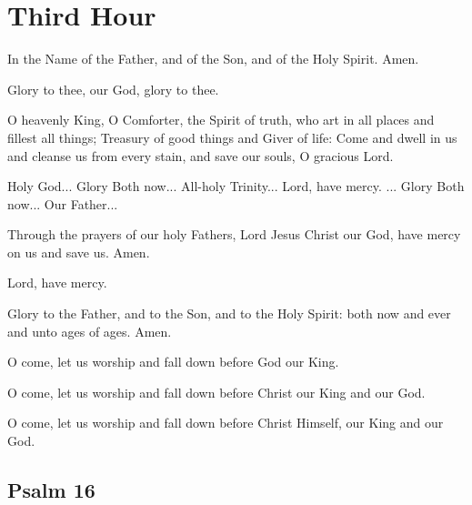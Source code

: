 \section{Third Hour}

In the Name of the Father, and of the Son, and of the Holy Spirit. Amen.

Glory to thee, our God, glory to thee.

O heavenly King, O Comforter, the Spirit of truth, who art in all places and fillest all things; Treasury of good things and Giver of life: Come and dwell in us and cleanse us from every stain, and save our souls, O gracious Lord.

Holy God... Glory  Both now... All-holy Trinity... Lord, have mercy. ... Glory  Both now... Our Father...

Through the prayers of our holy Fathers, Lord Jesus Christ our God, have mercy on us and save us. Amen.

Lord, have mercy. 

Glory to the Father, and to the Son, and to the Holy Spirit: both now and ever and unto ages of ages. Amen.

O come, let us worship and fall down before God our King. 

O come, let us worship and fall down before Christ our King and our God. 

O come, let us worship and fall down before Christ Himself, our King and our God. 

\subsection{Psalm 16}

